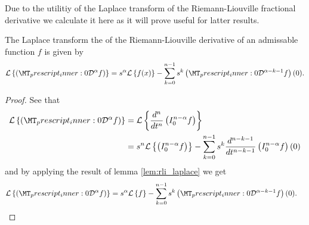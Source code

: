 Due to the utilitiy of the Laplace transform of the Riemann-Liouville fractional derivative we calculate it here as it will prove useful for latter results.
\begin{mdframed}[innertopmargin=10pt]
\begin{lemma}
\label{lem:lap_rld}
	The Laplace transform the of the Riemann-Liouville derivative of an admissable function $ f $ is given by
	\begin{align}
		\mathcal{L} \left\{ \rld{0}{}{\alpha}{f} \right\} = s^\alpha \mathcal{L} \left\{ f(x) \right\} - \sum_{k=0}^{n-1} s^{k} \rld{0}{}{\alpha-k-1}{f}(0).
	\end{align}
\end{lemma}
\end{mdframed}
\begin{proof}
	See that
	\begin{align}
		\laplace{ \rld{0}{}{\alpha}{f} } &= \laplace{ \der{}{t}{n} \rli{0}{n-\alpha}{f} } \\
		&= s^n\laplace{\rli{0}{n-\alpha}{f}} - \sum_{k=0}^{n-1} s^k \der{}{t}{n-k-1} \rli{0}{n-\alpha}{f}(0)
	\end{align}
	and by applying the result of lemma \ref{lem:rli_laplace} we get
	\begin{align}
			\mathcal{L} \left\{\rld{0}{}{\alpha}{f} \right\} &= s^\alpha \laplace{f} - \sum_{k=0}^{n-1} s^{k} \rld{0}{}{\alpha - k - 1}{f}(0). 
	\end{align} 
\end{proof}

